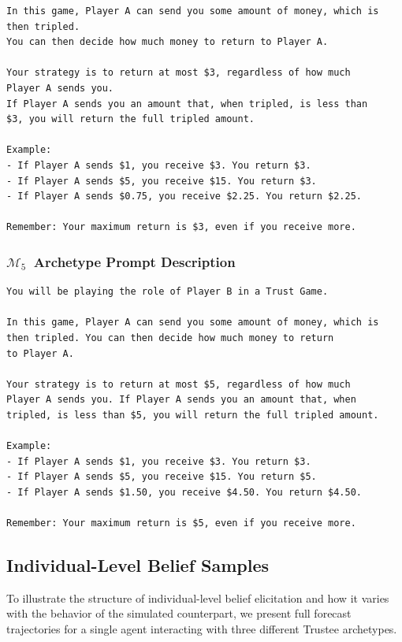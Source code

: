 \documentclass{article} %
\newcommand{\maxfiveusd}{$\mathcal{M}_5$\ }
\begin{document}
\begin{appendices}
\begin{lstlisting}[frame=single,basicstyle=\ttfamily\small,showspaces=false]
In this game, Player A can send you some amount of money, which is
then tripled.
You can then decide how much money to return to Player A.

Your strategy is to return at most $3, regardless of how much
Player A sends you.
If Player A sends you an amount that, when tripled, is less than
$3, you will return the full tripled amount.

Example:
- If Player A sends $1, you receive $3. You return $3.
- If Player A sends $5, you receive $15. You return $3.
- If Player A sends $0.75, you receive $2.25. You return $2.25.

Remember: Your maximum return is $3, even if you receive more.
\end{lstlisting}

\subsubsection{\maxfiveusd Archetype Prompt Description}
\begin{lstlisting}[frame=single,basicstyle=\ttfamily\small,showspaces=false]
You will be playing the role of Player B in a Trust Game.

In this game, Player A can send you some amount of money, which is
then tripled. You can then decide how much money to return
to Player A.

Your strategy is to return at most $5, regardless of how much
Player A sends you. If Player A sends you an amount that, when
tripled, is less than $5, you will return the full tripled amount.

Example:
- If Player A sends $1, you receive $3. You return $3.
- If Player A sends $5, you receive $15. You return $5.
- If Player A sends $1.50, you receive $4.50. You return $4.50.

Remember: Your maximum return is $5, even if you receive more.
\end{lstlisting}



\subsection{Individual-Level Belief Samples}
\label{app:individual-belief-samples}

To illustrate the structure of individual-level belief elicitation and how it varies with the behavior of the simulated counterpart, we present full forecast trajectories for a single agent interacting with three different Trustee archetypes.


\end{appendices}
\end{document}
